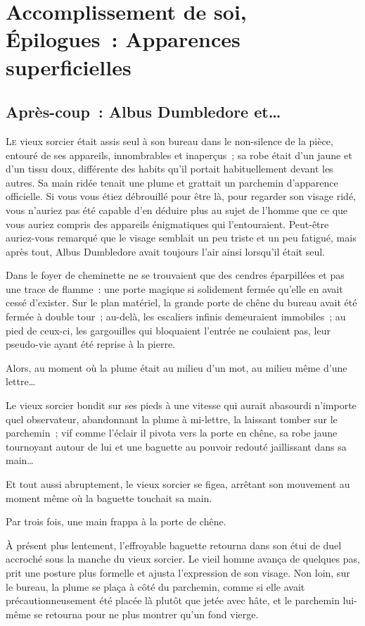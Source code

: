 \chapter{Accomplissement de soi, Épilogues~: Apparences superficielles}

\section{Après-coup~: Albus Dumbledore et…}

\lettrine{L}{e} vieux sorcier était assis seul à son bureau dans le non-silence de la pièce, entouré de ses appareils, innombrables et inaperçus~; sa robe était d'un jaune et d'un tissu doux, différente des habits qu'il portait habituellement devant les autres. Sa main ridée tenait une plume et grattait un parchemin d'apparence officielle. Si vous vous étiez débrouillé pour être là, pour regarder son visage ridé, vous n'auriez pas été capable d'en déduire plus au sujet de l'homme que ce que vous auriez compris des appareils énigmatiques qui l'entouraient. Peut-être auriez-vous remarqué que le visage semblait un peu triste et un peu fatigué, mais après tout, Albus Dumbledore avait toujours l'air ainsi lorsqu'il était seul.

Dans le foyer de cheminette ne se trouvaient que des cendres éparpillées et pas une trace de flamme~: une porte magique si solidement fermée qu'elle en avait cessé d'exister. Sur le plan matériel, la grande porte de chêne du bureau avait été fermée à double tour~; au-delà, les escaliers infinis demeuraient immobiles~; au pied de ceux-ci, les gargouilles qui bloquaient l'entrée ne coulaient pas, leur pseudo-vie ayant été reprise à la pierre.

Alors, au moment où la plume était au milieu d'un mot, au milieu même d'une lettre…

Le vieux sorcier bondit sur ses pieds à une vitesse qui aurait abasourdi n'importe quel observateur, abandonnant la plume à mi-lettre, la laissant tomber sur le parchemin~; vif comme l'éclair il pivota vers la porte en chêne, sa robe jaune tournoyant autour de lui et une baguette au pouvoir redouté jaillissant dans sa main…

Et tout aussi abruptement, le vieux sorcier se figea, arrêtant son mouvement au moment même où la baguette touchait sa main.

Par trois fois, une main frappa à la porte de chêne.

À présent plus lentement, l'effroyable baguette retourna dans son étui de duel accroché sous la manche du vieux sorcier. Le vieil homme avança de quelques pas, prit une posture plus formelle et ajusta l'expression de son visage. Non loin, sur le bureau, la plume se plaça à côté du parchemin, comme si elle avait précautionneusement été placée là plutôt que jetée avec hâte, et le parchemin lui-même se retourna pour ne plus montrer qu'un fond vierge.

